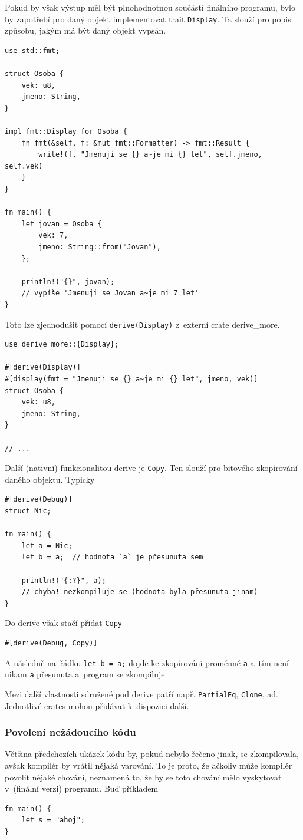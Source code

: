 \documentclass[a4paper, 12pt, twoside]{article} %
\newcommand{\rust}[1]{\texttt{#1}}
\begin{document}
			Pokud by však výstup měl být plnohodnotnou součástí finálního programu, bylo by zapotřebí pro daný objekt implementovat trait \rust{Display}. Ta slouží pro popis způsobu, jakým má být daný objekt vypsán.
			\begin{verbatim}
use std::fmt;

struct Osoba {
	vek: u8,
	jmeno: String,
}

impl fmt::Display for Osoba {
	fn fmt(&self, f: &mut fmt::Formatter) -> fmt::Result {
		write!(f, "Jmenuji se {} a~je mi {} let", self.jmeno, self.vek)
	}
}

fn main() {
	let jovan = Osoba {
		vek: 7,
		jmeno: String::from("Jovan"),
	};
	
	println!("{}", jovan);
	// vypíše 'Jmenuji se Jovan a~je mi 7 let'
}
			\end{verbatim}
			
			Toto lze zjednodušit pomocí \texttt{derive(Display)} z~externí crate derive\_more.
			\begin{verbatim}
use derive_more::{Display};

#[derive(Display)]
#[display(fmt = "Jmenuji se {} a~je mi {} let", jmeno, vek)]
struct Osoba {
	vek: u8,
	jmeno: String,
}

// ...
			\end{verbatim}

			Další (nativní) funkcionalitou derive je \rust{Copy}. Ten slouží pro bitového zkopírování daného objektu. Typicky
			\begin{verbatim}
#[derive(Debug)]
struct Nic;

fn main() {
	let a = Nic;
	let b = a;  // hodnota `a` je přesunuta sem
	
	println!("{:?}", a);
	// chyba! nezkompiluje se (hodnota byla přesunuta jinam)
}
				\end{verbatim}
			
				Do derive však stačí přidat \rust{Copy}
				\begin{verbatim}
#[derive(Debug, Copy)]
				\end{verbatim}
			
				A následně na~řádku \rust{let b = a;} dojde ke zkopírování proměnné \rust{a} a~tím není nikam \texttt{a} přesunuta a~program se zkompiluje.

				Mezi další vlastnosti sdružené pod derive patří např. \rust{PartialEq}, \rust{Clone}, ad. Jednotlivé crates mohou přidávat k~dispozici další.


		\subsubsection*{Povolení nežádoucího kódu}
			Většina předchozích ukázek kódu by, pokud nebylo řečeno jinak, se zkompilovala, avšak kompilér by vrátil nějaká varování. To je proto, že ačkoliv může kompilér povolit nějaké chování, neznamená to, že by se toto chování mělo vyskytovat v~(finální verzi) programu. Buď příkladem
			\begin{verbatim}
fn main() {
	let s = "ahoj";
}
			\end{verbatim}
			
\end{document}
